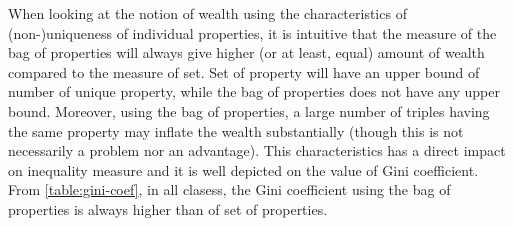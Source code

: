 \begin{center}
    \scriptsize
\end{center}

When looking at the notion of wealth using the characteristics of (non-)uniqueness of individual properties, it is intuitive that the measure of the bag of properties will always give higher (or at least, equal) amount of wealth compared to the measure of set. Set of property will have an upper bound of number of unique property, while the bag of properties does not have any upper bound. Moreover, using the bag of properties, a large number of triples having the same property may inflate the wealth substantially (though this is not necessarily a problem nor an advantage). This characteristics has a direct impact on inequality measure and it is well depicted on the value of Gini coefficient. From \autoref{table:gini-coef}, in all clasess, the Gini coefficient using the bag of properties is always higher than of set of properties.

